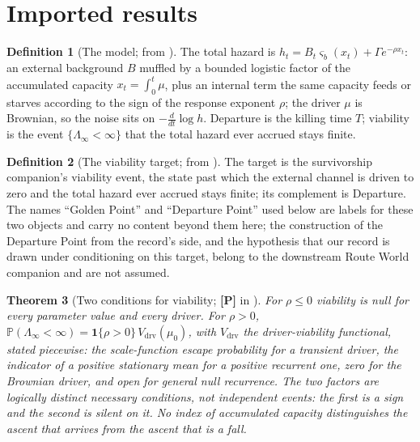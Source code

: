 \documentclass[11pt]{article}
\newcommand{\PP}{\mathbb{P}}
\newcommand{\one}{\mathbf{1}}
\theoremstyle{plain}
\newtheorem{theorem}{Theorem}[section]
\theoremstyle{definition}
\newtheorem{definition}[theorem]{Definition}
\theoremstyle{remark}
\begin{document}
\section{Imported results}\label{sec:imports}

\begin{definition}[The model; from \cite{SurvA}]\label{imp:model}
The total hazard is $h_t=B_t\varsigma_b(x_t)+\Gamma e^{-\rho x_t}$: an
external background $B$ muffled by a bounded logistic factor of the
accumulated capacity $x_t=\int_0^t\mu$, plus an internal term the same
capacity feeds or starves according to the sign of the response exponent
$\rho$; the driver $\mu$ is Brownian, so the noise sits on
$-\frac{d}{dt}\log h$. Departure is the killing time $T$; viability is
the event $\{\Lambda_\infty<\infty\}$ that the total hazard ever accrued
stays finite.
\end{definition}

\begin{definition}[The viability target; from \cite{SurvA}]\label{imp:goldenpoint}
The target is the survivorship companion's viability event, the state
past which the external channel is driven to zero and the total hazard
ever accrued stays finite; its complement is Departure. The names
``Golden Point'' and ``Departure Point'' used below are labels for these
two objects and carry no content beyond them here; the construction of
the Departure Point from the record's side, and the hypothesis that our
record is drawn under conditioning on this target, belong to the
downstream Route World companion and are not assumed.
\end{definition}

\begin{theorem}[Two conditions for viability; \textbf{[P]} in \cite{SurvA}]
\label{imp:twocond}
For $\rho\le0$ viability is null for every parameter value and every
driver. For $\rho>0$,
$\PP(\Lambda_\infty<\infty)=\one\{\rho>0\}\,V_{\mathrm{drv}}(\mu_0)$, with
$V_{\mathrm{drv}}$ the driver-viability functional, stated piecewise:
the scale-function escape probability for a transient driver, the
indicator of a positive stationary mean for a positive recurrent one,
zero for the Brownian driver, and open for general null recurrence. The
two factors are logically distinct necessary conditions, not independent
events: the first is a sign and the second is silent on it. No index of
accumulated capacity distinguishes the ascent that arrives from the
ascent that is a fall.
\end{theorem}
\end{document}
